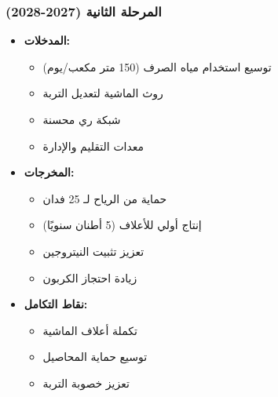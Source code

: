 \subsubsection{المرحلة الثانية (2027-2028)}
\begin{itemize}
    \item \textbf{المدخلات:}
    \begin{itemize}
        \item توسيع استخدام مياه الصرف (150 متر مكعب/يوم)
        \item روث الماشية لتعديل التربة
        \item شبكة ري محسنة
        \item معدات التقليم والإدارة
    \end{itemize}
    \item \textbf{المخرجات:}
    \begin{itemize}
        \item حماية من الرياح لـ 25 فدان
        \item إنتاج أولي للأعلاف (5 أطنان سنويًا)
        \item تعزيز تثبيت النيتروجين
        \item زيادة احتجاز الكربون
    \end{itemize}
    \item \textbf{نقاط التكامل:}
    \begin{itemize}
        \item تكملة أعلاف الماشية
        \item توسيع حماية المحاصيل
        \item تعزيز خصوبة التربة
    \end{itemize}
\end{itemize}

